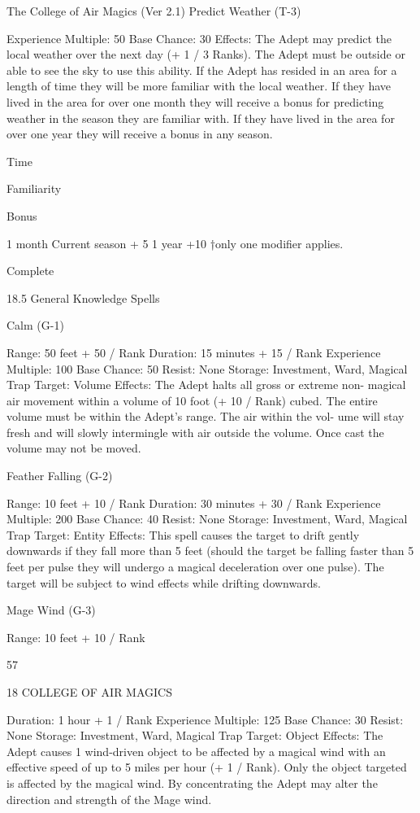 \begin{Chapter}{The College of Air Magics (Ver 2.1)}
Predict Weather (T-3) 

Experience Multiple: 50 
Base Chance: 30%
Effects:  The  Adept  may  predict  the  local  weather 
over the next day (+ 1 / 3 Ranks). The Adept must 
be outside or able to see the sky to use this ability. 
If  the  Adept  has  resided  in an area  for  a  length  of 
time  they  will  be  more  familiar  with  the  local 
weather. If they have lived in the area for over one 
month  they  will  receive  a  bonus  for  predicting 
weather in the season they are familiar with. If they 
have  lived  in  the  area  for  over  one  year  they  will 
receive a bonus in any season. 

Time 

Familiarity 

Bonus 

1 month  Current season  + 5%
1 year 
+10%
†only one modifier applies. 

Complete 

18.5 General Knowledge Spells 

Calm (G-1) 

Range: 50 feet + 50 / Rank 
Duration: 15 minutes + 15 / Rank 
Experience Multiple: 100 
Base Chance: 50%
Resist: None 
Storage: Investment, Ward, Magical Trap 
Target: Volume 
Effects:  The  Adept  halts  all  gross or  extreme  non-
magical  air  movement  within  a  volume  of  10  foot 
(+  10  /  Rank)  cubed.  The  entire  volume  must  be 
within  the  Adept’s  range.  The  air  within  the  vol-
ume  will  stay  fresh  and  will  slowly  intermingle 
with air outside the volume. Once cast the volume 
may not be moved. 

Feather Falling (G-2) 

Range: 10 feet + 10 / Rank 
Duration: 30 minutes + 30 / Rank 
Experience Multiple: 200 
Base Chance: 40%
Resist: None 
Storage: Investment, Ward, Magical Trap 
Target: Entity 
Effects:  This  spell  causes  the  target  to  drift  gently 
downwards if they fall more than 5 feet (should the 
target  be  falling  faster  than  5  feet  per  pulse  they 
will  undergo  a  magical  deceleration  over  one 
pulse).  The  target  will  be  subject  to  wind  effects 
while drifting downwards. 

Mage Wind (G-3) 

Range: 10 feet + 10 / Rank 

57 

18 COLLEGE OF AIR MAGICS 

Duration: 1 hour + 1 / Rank 
Experience Multiple: 125 
Base Chance: 30%
Resist: None 
Storage: Investment, Ward, Magical Trap 
Target: Object 
Effects:  The  Adept  causes  1  wind-driven  object to 
be  affected  by  a  magical  wind  with  an  effective 
speed of up to 5 miles per hour (+ 1 / Rank). Only 
the object targeted is affected by the magical wind. 
By concentrating the Adept may alter the direction 
and strength of the Mage wind. 


\end{Chapter}
